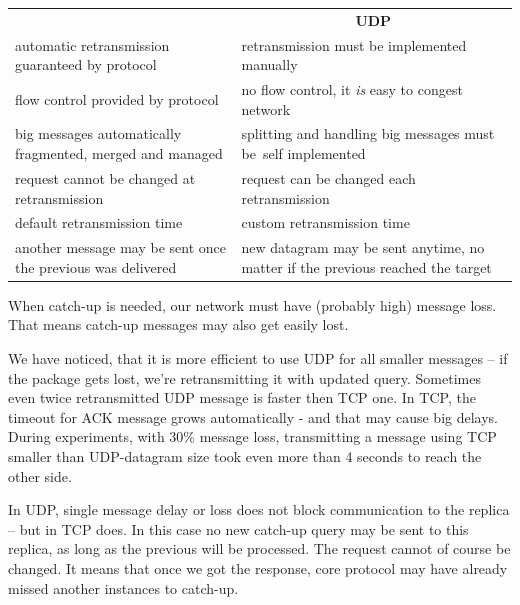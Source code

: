 \begin{center}
\small
\begin{tabular}{>{\raggedleft\hspace{0pt}}m{}m{}}

\multicolumn{1}{c}{ \textbf{TCP} }& \multicolumn{1}{c}{ \textbf{UDP} } \\ 
automatic retransmission guaranteed by protocol &
                                retransmission must be implemented manually \\ 
flow control provided by protocol & no flow control, it \emph{is} easy to congest network \\
big messages automatically fragmented, mer\-ged and managed &
                                splitting and handling big messages must be~self implemented \vspace{0.5em} \\

request cannot be changed at retransmission &
                                request can be changed each retransmission \\
default retransmission time & custom retransmission time \\
another message may be sent once the previous was delivered &
                                new datagram may be sent anytime, no matter if the previous reached the target \\

\end{tabular}
\end{center}

When catch-up is needed,  our network must have (probably high) message loss. That means catch-up messages may also get easily lost.

We have noticed, that it is more efficient to use UDP for all smaller messages -- if the package gets lost, we're retransmitting it with updated query. Sometimes even twice retransmitted UDP message is faster then TCP one. In TCP, the timeout for ACK message grows automatically - and that may cause big delays. During experiments, with 30\% message loss, transmitting a message using TCP smaller than UDP-datagram size took even more than 4 seconds to reach the other side.

In UDP, single message delay or loss does not block communication to the replica -- but in TCP does.
In this case no new catch-up query may be sent to this replica, as long as the previous will be processed. The request cannot of course be changed. It means that once we got the response, core protocol may have already missed another instances to catch-up.

